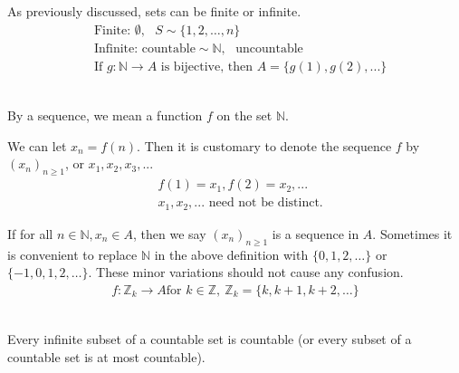 As previously discussed, sets can be finite or infinite.
\begin{align*}
    &\text{Finite: } \emptyset, ~~~S\sim \{1, 2,…,n\} \\
    &\text{Infinite: } \text{countable}\sim \mathbb{N}, ~~~\text{uncountable}
    \\
    &\text{If }g:\mathbb{N} \rightarrow A \text{ is bijective, then } A=\{g(1), g(2), ...\}
\end{align*}

\begin{definition}[Sequence] \leavevmode \\
    By a sequence, we mean a function $f$ on the set $\mathbb{N}$.
\end{definition}

\begin{note}
    We can let $x_n = f(n)$. Then it is customary to denote the sequence $f$ by $( x_n )_{n \geq1}$, or $x_1, x_2, x_3, ...$
    \begin{align*}
        &f(1)=x_1, f(2)=x_2, ... \\
        &x_1, x_2,... \text{ need not be distinct.}
    \end{align*}
\end{note}

\begin{remark}
    If for all $n\in \mathbb{N}, x_n\in A$, then we say $(x_n)_{n\geq1}$ is a sequence in $A$.
    Sometimes it is convenient to replace $\mathbb{N}$ in the above definition with $\{0, 1, 2,…\}$ or $\{-1, 0, 1, 2,…\}$. These minor variations should not cause any confusion.
    \begin{align*}
        f:\mathbb{Z}_k \rightarrow A
        \text{for } k\in \mathbb{Z}, ~\mathbb{Z}_k=\{k, k+1, k+2, …\}
    \end{align*}
\end{remark}

\begin{theorem} \leavevmode \\
    \label{thm.A}
    Every infinite subset of a countable set is countable (or every subset of a countable set is at most countable).
\end{theorem}

